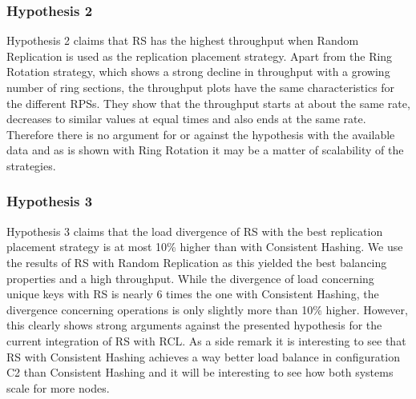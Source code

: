 \subsubsection{Hypothesis 2}
Hypothesis 2 claims that \ac{RS} has the highest throughput when Random Replication is used as the replication placement strategy.
Apart from the Ring Rotation strategy, which shows a strong decline in throughput with a growing number of ring sections, the throughput plots have the same characteristics for the different \acp{RPS}.
They show that the throughput starts at about the same rate, decreases to similar values at equal times and also ends at the same rate.
Therefore there is no argument for or against the hypothesis with the available data and as is shown with Ring Rotation it may be a matter of scalability of the strategies.

\subsubsection{Hypothesis 3}
Hypothesis 3 claims that the load divergence of \ac{RS} with the best replication placement strategy is at most 10\% higher than with Consistent Hashing.
We use the results of \ac{RS} with Random Replication as this yielded the best balancing properties and a high throughput.
While the divergence of load concerning unique keys with \ac{RS} is nearly 6 times the one with Consistent Hashing, the divergence concerning operations is only slightly more than 10\% higher.
However, this clearly shows strong arguments against the presented hypothesis for the current integration of \ac{RS} with \ac{RCL}.
As a side remark it is interesting to see that \ac{RS} with Consistent Hashing achieves a way better load balance in configuration C2 than Consistent Hashing and it will be interesting to see how both systems scale for more nodes.

